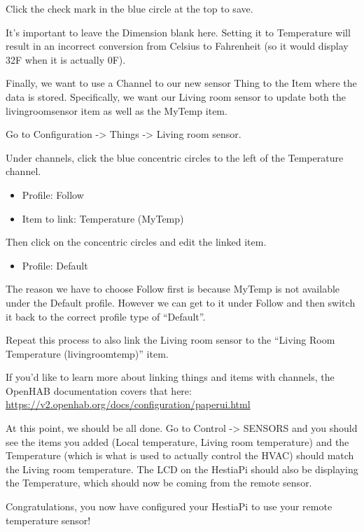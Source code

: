 Click the check mark in the blue circle at the top to save.

It's important to leave the Dimension blank here. Setting it to Temperature
will result in an incorrect conversion from Celsius to Fahrenheit (so it would
display 32F when it is actually 0F).

Finally, we want to use a Channel to our new sensor Thing to the Item where the
data is stored. Specifically, we want our Living room sensor to update both the
livingroomsensor item as well as the MyTemp item.

Go to Configuration -> Things -> Living room sensor.

Under channels, click the blue concentric circles to the left of the
Temperature channel.

\begin{itemize}
\item Profile: Follow
\item Item to link: Temperature (MyTemp)
\end{itemize}

Then click on the concentric circles and edit the linked item.

\begin{itemize}
\item Profile: Default
\end{itemize}

The reason we have to choose Follow first is because MyTemp is not available
under the Default profile. However we can get to it under Follow and then
switch it back to the correct profile type of ``Default''.

Repeat this process to also link the Living room sensor to the ``Living Room
Temperature (livingroomtemp)'' item.

If you'd like to learn more about linking things and items with channels, the
OpenHAB documentation covers that here:
\url{https://v2.openhab.org/docs/configuration/paperui.html}

At this point, we should be all done. Go to Control -> SENSORS and you should
see the items you added (Local temperature, Living room temperature) and the
Temperature (which is what is used to actually control the HVAC) should match
the Living room temperature. The LCD on the HestiaPi should also be displaying
the Temperature, which should now be coming from the remote sensor.

Congratulations, you now have configured your HestiaPi to use your remote
temperature sensor!
